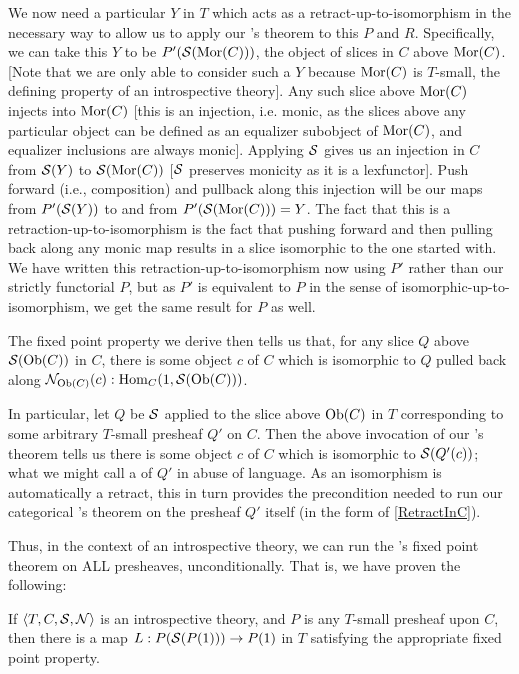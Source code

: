 We now need a particular $Y$ in $T$ which acts as a retract-up-to-isomorphism in the necessary way to allow us to apply our \Loeb's theorem to this $P$ and $R$. Specifically, we can take this $Y$ to be $P'(\mathcal{S}(\operatorname{Mor}(C)))$, the object of slices in $C$ above $\operatorname{Mor}(C)$. [Note that we are only able to consider such a $Y$ because $\operatorname{Mor}(C)$ is $T$-small, the defining property of an introspective theory]. Any such slice above $\operatorname{Mor}(C)$ injects into $\operatorname{Mor}(C)$ [this is an injection, i.e. monic, as the slices above any particular object can be defined as an equalizer subobject of $\operatorname{Mor}(C)$, and equalizer inclusions are always monic]. Applying $\mathcal{S}$ gives us an injection in $C$ from $\mathcal{S}(Y)$ to $\mathcal{S}(\operatorname{Mor}(C))$ [$\mathcal{S}$ preserves monicity as it is a lexfunctor]. Push forward (i.e., composition) and pullback along this injection will be our maps from $P'(\mathcal{S}(Y))$ to and from $P'(\mathcal{S}(\operatorname{Mor}(C))) = Y$. The fact that this is a retraction-up-to-isomorphism is the fact that pushing forward and then pulling back along any monic map results in a slice isomorphic to the one started with. We have written this retraction-up-to-isomorphism now using $P'$ rather than our strictly functorial $P$, but as $P'$ is equivalent to $P$ in the sense of isomorphic-up-to-isomorphism, we get the same result for $P$ as well. 

The fixed point property we derive then tells us that, for any slice $Q$ above $\mathcal{S}(\operatorname{Ob}(C))$ in $C$, there is some object $c$ of $C$ which is isomorphic to $Q$ pulled back along $\mathcal{N}_{\operatorname{Ob}(C)}(c) : \operatorname{Hom}_C(1, \mathcal{S}(\operatorname{Ob}(C)))$.

In particular, let $Q$ be $\mathcal{S}$ applied to the slice above $\operatorname{Ob}(C)$ in $T$ corresponding to some arbitrary $T$-small presheaf $Q'$ on $C$. Then the above invocation of our \Loeb's theorem tells us there is some object $c$ of $C$ which is isomorphic to $\mathcal{S}(Q'(c))$; what we might call a  of $Q'$ in abuse of language. As an isomorphism is automatically a retract, this in turn provides the precondition needed to run our categorical \Loeb's theorem on the presheaf $Q'$ itself (in the form of \cref{RetractInC}).

Thus, in the context of an introspective theory, we can run the \Loeb's fixed point theorem on ALL presheaves, unconditionally. That is, we have proven the following:

\begin{corollary}\label{LoebInIntrosp}
If $\langle T, C, \mathcal{S}, \mathcal{N} \rangle$ is an introspective theory, and $P$ is any $T$-small presheaf upon $C$, then there is a map $L : P(\mathcal{S}(P(1))) \to P(1)$ in $T$ satisfying the appropriate fixed point property.
\end{corollary}

